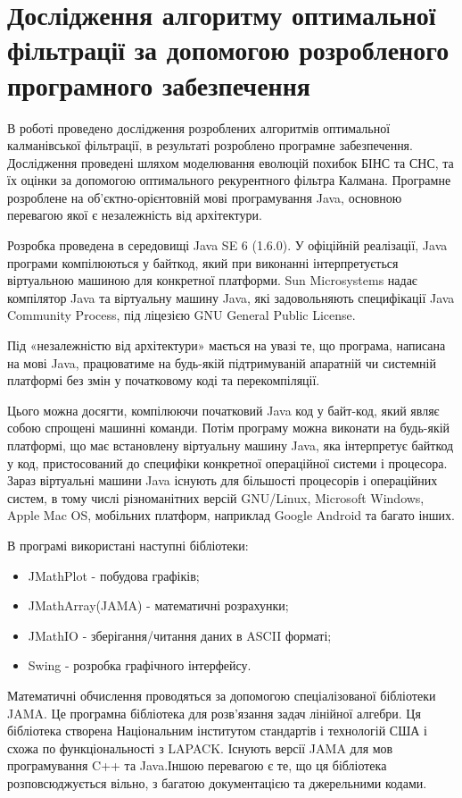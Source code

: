 \section{Дослідження алгоритму оптимальної фільтрації за допомогою розробленого програмного забезпечення}
В роботі проведено дослідження розроблених алгоритмів оптимальної калманівської фільтрації, в результаті розроблено програмне забезпечення. Дослідження проведені шляхом моделювання еволюцій похибок БІНС та СНС, та їх оцінки за допомогою оптимального рекурентного фільтра Калмана. Програмне розроблене на об'єктно-орієнтовній мові програмування Java, основною перевагою якої є незалежність від архітектури.

Розробка проведена в середовищі Java SE 6 (1.6.0). У офіційній реалізації, Java програми компілюються у байткод, який при виконанні інтерпретується віртуальною машиною для конкретної платформи. Sun Microsystems надає компілятор Java та віртуальну машину Java, які задовольняють специфікації Java Community Process, під ліцезією GNU General Public License. 

Під «незалежністю від архітектури» мається на увазі те, що програма, написана на мові Java, працюватиме на будь-якій підтримуваній апаратній чи системній платформі без змін у початковому коді та перекомпіляції.

Цього можна досягти, компілюючи початковий Java код у байт-код, який являє собою спрощені машинні команди. Потім програму можна виконати на будь-якій платформі, що має встановлену віртуальну машину Java, яка інтерпретує байткод у код, пристосований до специфіки конкретної операційної системи і процесора. Зараз віртуальні машини Java існують для більшості процесорів і операційних систем, в тому числі різноманітних версій GNU/Linux, Microsoft Windows, Apple Mac OS, мобільних платформ, наприклад Google Android та багато інших.

В програмі використані наступні бібліотеки:
\begin{itemize}
  \item JMathPlot - побудова графіків;
  \item JMathArray(JAMA) - математичні розрахунки;
  \item JMathIO - зберігання/читання даних в ASCII форматі;
  \item Swing - розробка графічного інтерфейсу.
\end{itemize}

Математичні обчислення проводяться за допомогою спеціалізованої бібліотеки JAMA. Це програмна бібліотека для розв'язання задач лінійної алгебри. Ця бібліотека створена Національним інститутом стандартів і технологій США і схожа по функціональності з LAPACK. Існують версії JAMA для мов програмування C++ та Java.Іншою перевагою є те, що ця бібліотека розповсюджується вільно, з багатою документацією та джерельними кодами.

